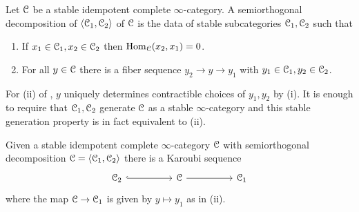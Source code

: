 \begin{definition}\label{def: semoirthogonal decomposition}
    Let $\EuScript{C}$ be a stable idempotent complete $\infty$-category. A semiorthogonal decomposition of $\langle\EuScript{C}_{1},\EuScript{C}_{2}\rangle$ of $\EuScript{C}$ is the data of stable subcategories $\EuScript{C}_{1},\EuScript{C}_{2}$ such that 
    \begin{enumerate}[label=(\roman*)]
        \item If $x_{1}\in\EuScript{C}_{1}, x_{2}\in\EuScript{C}_{2}$ then $\mathrm{Hom}_{\EuScript{C}}(x_{2},x_{1})=0$. 
        \item For all $y\in\EuScript{C}$ there is a fiber sequence $y_{2}\to y\to y_{1}$ with $y_{1}\in\EuScript{C}_{1},y_{2}\in\EuScript{C}_{2}$. 
    \end{enumerate}
\end{definition}
\begin{remark}
    For (ii) of , $y$ uniquely determines contractible choices of $y_{1},y_{2}$ by (i). It is enough to require that $\EuScript{C}_{1},\EuScript{C}_{2}$ generate $\EuScript{C}$ as a stable $\infty$-category and this stable generation property is in fact equivalent to (ii). 
\end{remark} 
Given a stable idempotent complete $\infty$-category $\EuScript{C}$ with semiorthogonal decomposition $\EuScript{C}=\langle\EuScript{C}_{1},\EuScript{C}_{2}\rangle$ there is a Karoubi sequence 
$$%
\begin{tikzcd}
	{\Cscr_{2}} && \Cscr && {\Cscr_{1}}
	\arrow[hook, from=1-1, to=1-3]
	\arrow[from=1-3, to=1-5]
\end{tikzcd}$$
where the map $\EuScript{C}\to\EuScript{C}_{1}$ is given by $y\mapsto y_{1}$ as in  (ii). 

